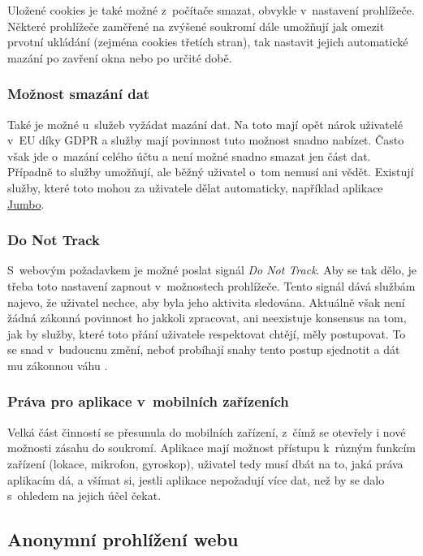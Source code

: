 Uložené cookies je také možné z~počítače smazat, obvykle v~nastavení prohlížeče. Některé prohlížeče zaměřené na zvýšené soukromí dále umožňují jak omezit prvotní ukládání (zejména cookies třetích stran), tak nastavit jejich automatické mazání po zavření okna nebo po určité době.

\subsubsection*{Možnost smazání dat}
Také je možné u~služeb vyžádat mazání dat. Na toto mají opět nárok uživatelé v~EU díky GDPR a služby mají povinnost tuto možnost snadno nabízet. Často však jde o~mazání celého účtu a není možné snadno smazat jen část dat. Případně to služby umožňují, ale běžný uživatel o~tom nemusí ani vědět. Existují služby, které toto mohou za uživatele dělat automaticky, například aplikace \href{https://www.jumboprivacy.com}{Jumbo}. 

\subsubsection*{Do Not Track}
S~webovým požadavkem je možné poslat signál \textit{Do Not Track}. Aby se tak dělo, je třeba toto nastavení zapnout v~možnostech prohlížeče. Tento signál dává službám najevo, že uživatel nechce, aby byla jeho aktivita sledována. Aktuálně však není žádná zákonná povinnost ho jakkoli zpracovat, ani neexistuje konsensus na tom, jak by služby, které toto přání uživatele respektovat chtějí, měly postupovat. To se snad v~budoucnu změní, neboť probíhají snahy tento postup sjednotit a dát mu zákonnou váhu \citep{do-not-track-future}.

\subsubsection*{Práva pro aplikace v~mobilních zařízeních}
Velká část činností se přesunula do mobilních zařízení, z~čímž se otevřely i nové možnosti zásahu do soukromí. Aplikace mají možnost přístupu k~různým funkcím zařízení (lokace, mikrofon, gyroskop), uživatel tedy musí dbát na to, jaká práva aplikacím dá, a všímat si, jestli aplikace nepožadují více dat, než by se dalo s~ohledem na jejich účel čekat.

\subsection{Anonymní prohlížení webu}

